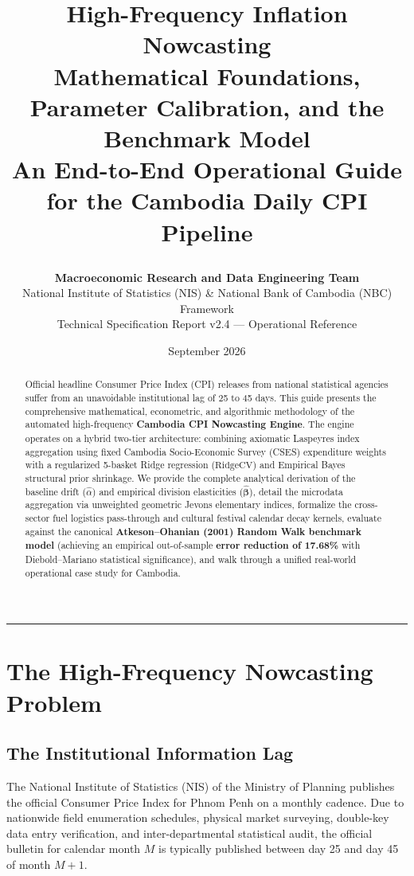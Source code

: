 \documentclass[a4paper, 11pt]{article}
\title{\vspace{-1.0cm}
\begin{tcolorbox}[colback=primaryblue, colframe=primaryblue, arc=2mm]
\centering \color{white}
{\Huge \textbf{High-Frequency Inflation Nowcasting}}\\[6pt]
{\Large Mathematical Foundations, Parameter Calibration, and the Benchmark Model}\\[4pt]
{\normalsize An End-to-End Operational Guide for the Cambodia Daily CPI Pipeline}
\end{tcolorbox}
\vspace{-0.5cm}
}
\author{\textbf{Macroeconomic Research and Data Engineering Team} \\
National Institute of Statistics (NIS) \& National Bank of Cambodia (NBC) Framework \\
\small Technical Specification Report v2.4 --- Operational Reference}
\date{September 2026}
\begin{document}
\maketitle
\thispagestyle{fancy}

\begin{abstract}
\noindent Official headline Consumer Price Index (CPI) releases from national statistical agencies suffer from an unavoidable institutional lag of 25 to 45 days. This guide presents the comprehensive mathematical, econometric, and algorithmic methodology of the automated high-frequency \textbf{Cambodia CPI Nowcasting Engine}. The engine operates on a hybrid two-tier architecture: combining axiomatic Laspeyres index aggregation using fixed Cambodia Socio-Economic Survey (CSES) expenditure weights with a regularized 5-basket Ridge regression ($\text{RidgeCV}$) and Empirical Bayes structural prior shrinkage. We provide the complete analytical derivation of the baseline drift ($\hat{\alpha}$) and empirical division elasticities ($\hat{\boldsymbol{\beta}}$), detail the microdata aggregation via unweighted geometric Jevons elementary indices, formalize the cross-sector fuel logistics pass-through and cultural festival calendar decay kernels, evaluate against the canonical \textbf{Atkeson--Ohanian (2001) Random Walk benchmark model} (achieving an empirical out-of-sample \textbf{error reduction of 17.68\%} with Diebold--Mariano statistical significance), and walk through a unified real-world operational case study for Cambodia.
\end{abstract}

\vspace{0.3cm}
\tableofcontents
\vspace{0.5cm}
\hrule
\vspace{0.5cm}

\section{The High-Frequency Nowcasting Problem}

\subsection{The Institutional Information Lag}
The National Institute of Statistics (NIS) of the Ministry of Planning publishes the official Consumer Price Index for Phnom Penh on a monthly cadence. Due to nationwide field enumeration schedules, physical market surveying, double-key data entry verification, and inter-departmental statistical audit, the official bulletin for calendar month $M$ is typically published between day 25 and day 45 of month $M+1$. 
\end{document}
